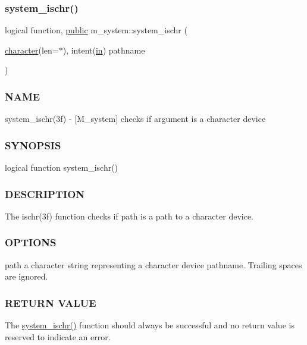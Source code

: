 \subsubsection{\texorpdfstring{system\+\_\+ischr()}{system\_ischr()}}
{\footnotesize\ttfamily logical function, \hyperlink{M__stopwatch_83_8txt_a2f74811300c361e53b430611a7d1769f}{public} m\+\_\+system\+::system\+\_\+ischr (\begin{DoxyParamCaption}\item[{\hyperlink{option__stopwatch_83_8txt_abd4b21fbbd175834027b5224bfe97e66}{character}(len=$\ast$), intent(\hyperlink{M__journal_83_8txt_afce72651d1eed785a2132bee863b2f38}{in})}]{pathname }\end{DoxyParamCaption})}



\subsubsection*{N\+A\+ME}

system\+\_\+ischr(3f) -\/ \mbox{[}M\+\_\+system\mbox{]} checks if argument is a character device 

\subsubsection*{S\+Y\+N\+O\+P\+S\+IS}

\begin{DoxyVerb}logical function system_ischr()
\end{DoxyVerb}


\subsubsection*{D\+E\+S\+C\+R\+I\+P\+T\+I\+ON}

The ischr(3f) function checks if path is a path to a character device.

\subsubsection*{O\+P\+T\+I\+O\+NS}

path a character string representing a character device pathname. Trailing spaces are ignored.

\subsubsection*{R\+E\+T\+U\+RN V\+A\+L\+UE}

The \hyperlink{namespacem__system_a12a948fa4aacda084a538ae3a5ae3cc6}{system\+\_\+ischr()} function should always be successful and no return value is reserved to indicate an error.

